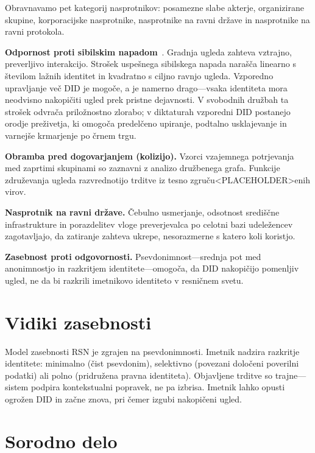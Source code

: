 \documentclass[11pt,a4paper,twocolumn]{article}
\begin{document}
Obravnavamo pet kategorij nasprotnikov: posamezne slabe akterje, organizirane skupine, korporacijske nasprotnike, nasprotnike na ravni države in nasprotnike na ravni protokola.

\textbf{Odpornost proti sibilskim napadom}~\cite{douceur2002}. Gradnja ugleda zahteva vztrajno, preverljivo interakcijo. Strošek uspešnega sibilskega napada narašča linearno s številom lažnih identitet in kvadratno s ciljno ravnjo ugleda. Vzporedno upravljanje več DID je mogoče, a je namerno drago---vsaka identiteta mora neodvisno nakopičiti ugled prek pristne dejavnosti. V svobodnih družbah ta strošek odvrača priložnostno zlorabo; v diktaturah vzporedni DID postanejo orodje preživetja, ki omogoča predelčeno upiranje, podtalno usklajevanje in varnejše krmarjenje po črnem trgu.

\textbf{Obramba pred dogovarjanjem (kolizijo).} Vzorci vzajemnega potrjevanja med zaprtimi skupinami so zaznavni z analizo družbenega grafa. Funkcije združevanja ugleda razvrednotijo trditve iz tesno zgruču<PLACEHOLDER>enih virov.

\textbf{Nasprotnik na ravni države.} Čebulno usmerjanje, odsotnost središčne infrastrukture in porazdelitev vloge preverjevalca po celotni bazi udeležencev zagotavljajo, da zatiranje zahteva ukrepe, nesorazmerne s katero koli koristjo.

\textbf{Zasebnost proti odgovornosti.} Psevdonimnost---srednja pot med anonimnostjo in razkritjem identitete---omogoča, da DID nakopičijo pomenljiv ugled, ne da bi razkrili imetnikovo identiteto v resničnem svetu.

\section{Vidiki zasebnosti}

Model zasebnosti RSN je zgrajen na psevdonimnosti. Imetnik nadzira razkritje identitete: minimalno (čist psevdonim), selektivno (povezani določeni poverilni podatki) ali polno (pridružena pravna identiteta). Objavljene trditve so trajne---sistem podpira kontekstualni popravek, ne pa izbrisa. Imetnik lahko opusti ogrožen DID in začne znova, pri čemer izgubi nakopičeni ugled.

\section{Sorodno delo}
\end{document}
